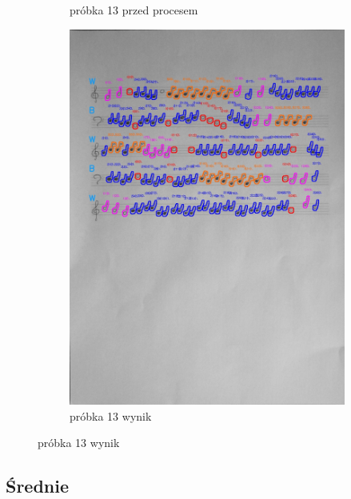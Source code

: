 \documentclass[11pt]{article}
\begin{document}
\begin{figure}
\begin{subfigure}[b]{0.475\textwidth}
        {{\small próbka 13 przed procesem}}
        \label{fig:sub3}
    \end{subfigure}
    \quad
    \begin{subfigure}[b]{0.475\textwidth}
        \centering
        \graphicspath{ {blobs/} }
        \includegraphics[width=\textwidth]{13_cnts.jpg}
        \caption[]%
        {{\small próbka 13 wynik}}
        \label{fig:sub 4}
    \end{subfigure}
    \label{fig 2}
\end{figure}

\FloatBarrier

\subsection{Średnie}
\end{document}
